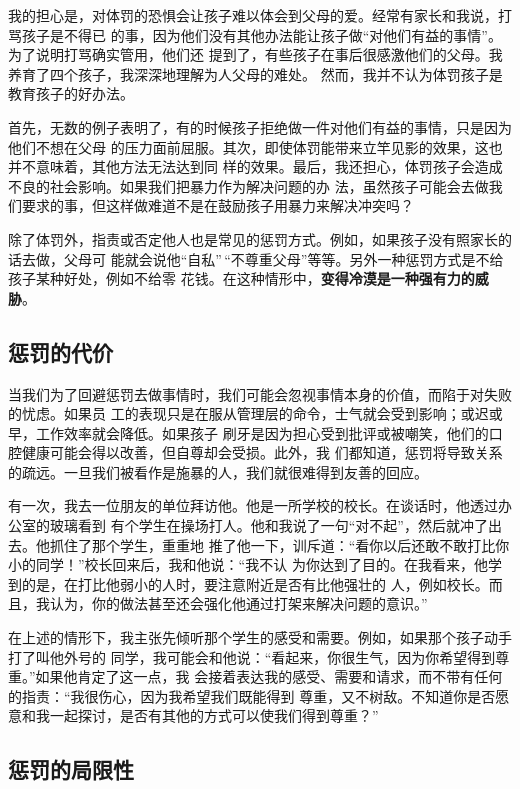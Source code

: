 \documentclass{ctexart}
\begin{document}
我的担心是，对体罚的恐惧会让孩子难以体会到父母的爱。经常有家长和我说，打骂孩子是不得已
的事，因为他们没有其他办法能让孩子做``对他们有益的事情''。为了说明打骂确实管用，他们还
提到了，有些孩子在事后很感激他们的父母。我养育了四个孩子，我深深地理解为人父母的难处。
然而，我并不认为体罚孩子是教育孩子的好办法。

首先，无数的例子表明了，有的时候孩子拒绝做一件对他们有益的事情，只是因为他们不想在父母
的压力面前屈服。其次，即使体罚能带来立竿见影的效果，这也并不意味着，其他方法无法达到同
样的效果。最后，我还担心，体罚孩子会造成不良的社会影响。如果我们把暴力作为解决问题的办
法，虽然孩子可能会去做我们要求的事，但这样做难道不是在鼓励孩子用暴力来解决冲突吗？

除了体罚外，指责或否定他人也是常见的惩罚方式。例如，如果孩子没有照家长的话去做，父母可
能就会说他``自私''\,``不尊重父母''等等。另外一种惩罚方式是不给孩子某种好处，例如不给零
花钱。在这种情形中，\textbf{变得冷漠是一种强有力的威胁}。


\subsection{惩罚的代价}

当我们为了回避惩罚去做事情时，我们可能会忽视事情本身的价值，而陷于对失败的忧虑。如果员
工的表现只是在服从管理层的命令，士气就会受到影响；或迟或早，工作效率就会降低。如果孩子
刷牙是因为担心受到批评或被嘲笑，他们的口腔健康可能会得以改善，但自尊却会受损。此外，我
们都知道，惩罚将导致关系的疏远。一旦我们被看作是施暴的人，我们就很难得到友善的回应。

有一次，我去一位朋友的单位拜访他。他是一所学校的校长。在谈话时，他透过办公室的玻璃看到
有个学生在操场打人。他和我说了一句``对不起''，然后就冲了出去。他抓住了那个学生，重重地
推了他一下，训斥道：``看你以后还敢不敢打比你小的同学！''校长回来后，我和他说：``我不认
为你达到了目的。在我看来，他学到的是，在打比他弱小的人时，要注意附近是否有比他强壮的
人，例如校长。而且，我认为，你的做法甚至还会强化他通过打架来解决问题的意识。''

在上述的情形下，我主张先倾听那个学生的感受和需要。例如，如果那个孩子动手打了叫他外号的
同学，我可能会和他说：``看起来，你很生气，因为你希望得到尊重。''如果他肯定了这一点，我
会接着表达我的感受、需要和请求，而不带有任何的指责：``我很伤心，因为我希望我们既能得到
尊重，又不树敌。不知道你是否愿意和我一起探讨，是否有其他的方式可以使我们得到尊重？''


\subsection{惩罚的局限性}
\end{document}
